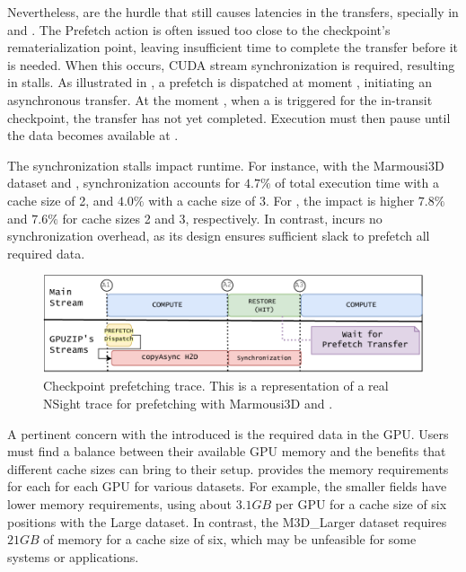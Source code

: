 \documentclass[Ingles]{ic-tese-v3}
\begin{document}

Nevertheless,  are the hurdle that still causes latencies in the \htd transfers, specially in \revolve and \zcut. The Prefetch action is often issued too close to the checkpoint's rematerialization point, leaving insufficient time to complete the transfer before it is needed. When this occurs, CUDA stream synchronization is required, resulting in stalls. As illustrated in , a prefetch is dispatched at moment , initiating an asynchronous transfer. At the moment , when a \restore is triggered for the in-transit checkpoint, the transfer has not yet completed. Execution must then pause until the data becomes available at .

The synchronization stalls impact runtime. For instance, with the Marmousi3D dataset and \revolve, synchronization accounts for $4.7\%$ of total execution time with a cache size of 2, and $4.0\%$ with a cache size of 3. For \zcut, the impact is higher $7.8\%$ and $7.6\%$ for cache sizes 2 and 3, respectively. In contrast, \uniform incurs no synchronization overhead, as its design ensures sufficient slack to prefetch all required \checkpointing data.

\begin{figure}[h]
  \centering
  \includegraphics[width=0.7\linewidth,trim={0 0 0 0},clip]{figures/prefetch_profile.pdf}
  \caption[Checkpoint prefetching trace]{Checkpoint prefetching trace. This is a representation of a real NSight trace for prefetching with Marmousi3D and \revolve.}
  \label{fig:prefetch_profile}
\end{figure}

A pertinent concern with the introduced \cache is the required data in the GPU. Users must find a balance between their available GPU memory and the benefits that different cache sizes can bring to their setup.  provides the memory requirements for each \cache for each GPU for various datasets. For example, the smaller fields have lower memory requirements, using about $3.1GB$ per GPU for a cache size of six positions with the Large dataset. In contrast, the M3D\_Larger dataset requires $21GB$ of memory for a cache size of six, which may be unfeasible for some systems or applications.
\end{document}
